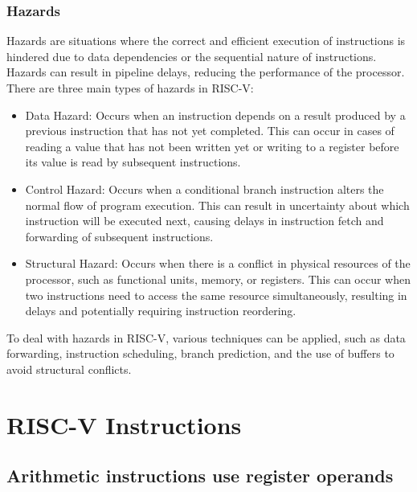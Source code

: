     
            \subsubsection{Hazards}

                Hazards are situations where the correct and efficient execution of instructions is hindered due to data dependencies or the sequential nature of instructions. Hazards can result in pipeline delays, reducing the performance of the processor. There are three main types of hazards in RISC-V:

                \begin{itemize}

                \item Data Hazard: Occurs when an instruction depends on a result produced by a previous instruction that has not yet completed. This can occur in cases of reading a value that has not been written yet or writing to a register before its value is read by subsequent instructions.

                \item Control Hazard: Occurs when a conditional branch instruction alters the normal flow of program execution. This can result in uncertainty about which instruction will be executed next, causing delays in instruction fetch and forwarding of subsequent instructions.
                
                \item Structural Hazard: Occurs when there is a conflict in physical resources of the processor, such as functional units, memory, or registers. This can occur when two instructions need to access the same resource simultaneously, resulting in delays and potentially requiring instruction reordering.
                \end{itemize}
                
                To deal with hazards in RISC-V, various techniques can be applied, such as data forwarding, instruction scheduling, branch prediction, and the use of buffers to avoid structural conflicts.

    \section{RISC-V Instructions} \label{sec:section_riscv_prof.3}

        \subsection{Arithmetic instructions use register
        operands}
        
